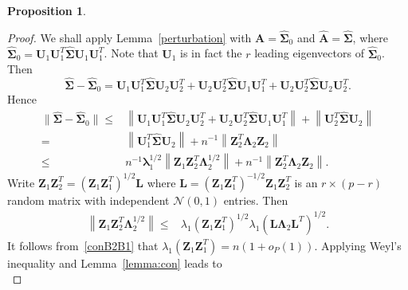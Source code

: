 \documentclass[12pt]{article} %
\newcommand{\bZ}{\mathbf{Z}}
\newcommand{\bA}{\mathbf{A}}
\newcommand{\bU}{\mathbf{U}}
\newcommand{\bL}{\mathbf{L}}
\newcommand{\bfsym}[1]{\ensuremath{\boldsymbol{#1}}}
\def\blambda {\bfsym {\lambda}}
\def\bLambda {\bfsym {\Lambda}}
\def\bSigma {\bfsym {\Sigma}}
\newtheorem{proposition}{Proposition}
\theoremstyle{definition}
\begin{document}
\begin{appendices}
\begin{proposition}
\end{proposition}
\begin{proof}

    We shall apply Lemma~\ref{perturbation} with $\bA=\hat{\bSigma}_0$ and $\hat{\bA}=\hat{\bSigma}$, where
    $\hat{\bSigma}_0=\bU_1\bU_1^T \hat{\bSigma}\bU_1\bU_1^T$.
    Note that
    $\bU_1$ is in fact the $r$ leading eigenvectors of $\hat{\bSigma}_0$. Then
    \begin{equation*}
        \hat{\bSigma}-\hat{\bSigma}_0 
        =
        \bU_1\bU_1^T \hat{\bSigma}\bU_2\bU_2^T + \bU_2\bU_2^T \hat{\bSigma}\bU_1\bU_1^T
        +\bU_2\bU_2^T \hat{\bSigma}\bU_2\bU_2^T
        .
    \end{equation*}
    Hence
    \begin{equation*}
        \begin{split}
            \|\hat{\bSigma}-\hat{\bSigma}_0 \| 
        \leq &
        \left\|
        \bU_1\bU_1^T \hat{\bSigma}\bU_2\bU_2^T + \bU_2\bU_2^T \hat{\bSigma}\bU_1\bU_1^T
        \right\|
        +
\left\| 
        \bU_2^T \hat{\bSigma}\bU_2
\right\|
        \\
        =&
         \left\|\bU_1^T \hat{\bSigma}\bU_2\right\|
        +
        n^{-1}\left\| 
        \bZ_2^T \bLambda_2 \bZ_2
\right\|
        \\
        \leq&
        n^{-1} \blambda_1^{1/2}\left\| \bZ_1 \bZ_2^T \bLambda_2^{1/2}\right\|
        +
        n^{-1}\left\| 
        \bZ_2^T \bLambda_2 \bZ_2
        \right\|.
        \end{split}
    \end{equation*}
    Write $\bZ_1 \bZ_2^T
        = (\bZ_1 \bZ_1^T)^{1/2} \bL $
    where $\bL=(\bZ_1 \bZ_1^T)^{-1/2}\bZ_1\bZ_2^T$ is an $r\times (p-r)$ random matrix with independent $\mathcal{N} (0,1)$ entries.
    Then
\begin{equation*}
    \begin{split}
 \left\| \bZ_1 \bZ_2^T \bLambda_2^{1/2}\right\|
        \leq &
        \lambda_1\left(  \bZ_1 \bZ_1^T \right)^{1/2}
        \lambda_1\left(\bL \bLambda_2 \bL^T \right)^{1/2}.
    \end{split}
\end{equation*}
It follows from~\eqref{conB2B1} that
$\lambda_1\left(  \bZ_1 \bZ_1^T \right)
=
n(1+o_P(1))$.
Applying Weyl's inequality and Lemma~\ref{lemma:con} leads to
\begin{equation*}

\end{equation*}
\end{proof}
\end{appendices}
\end{document}
